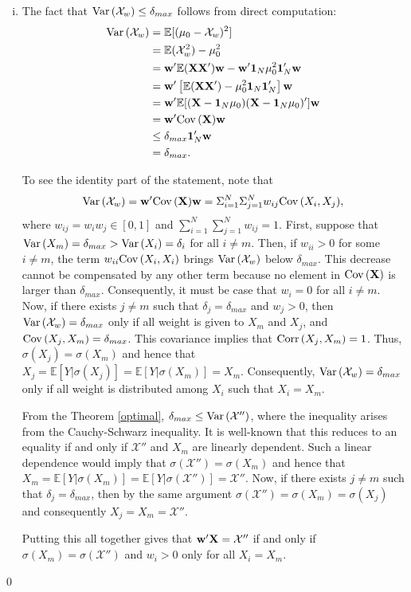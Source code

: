 \documentclass[11pt]{article}
\newcommand{\E}{\mathbb{E}}
\theoremstyle{definition}
\theoremstyle{definition}
\def\one{{\bf 1}}
\def\w{{\bf w}}
\def\X{{\bf X}}
\def\E{{\mathbb E}}
\def\Var{{\rm Var}\,}
\def\Cov{{\rm Cov}\,}
\def\Corr{{\rm Corr}\,}
\begin{document}
\begin{enumerate}[i)]

\item The fact that $\Var(\mathcal{X}_w)\leq \delta_{max}$ follows from direct computation:
\begin{align*}
\Var(\mathcal{X}_w) &= \E[(\mu_0 - \mathcal{X}_w)^2]\\
&= \E(\mathcal{X}_w^2) - \mu_0^2\\
&= \w' \E(\X \X')\w - \w'\one_N \mu_0^2\one_N'\w\\
&= \w' \left[ \E(\X \X') - \mu_0^2 \one_N \one_N' \right]\w\\
&= \w' \E[(\X - \one_N \mu_0)(\X - \one_N \mu_0)']\w\\
&= \w' \Cov(\X)\w\\
&\leq \delta_{max} \one_N'\w\\
&= \delta_{max}.
\end{align*}

To see the identity part of the statement, note that $$\Var(\mathcal{X}_w)  = \w' \Cov(\X)\w = \Sigma_{i=1}^N \Sigma_{j=1}^N w_{ij} \Cov(X_i, X_j),$$ where $w_{ij} = w_iw_j \in [0,1]$ and $\sum_{i=1}^N \sum_{j=1}^N w_{ij} = 1$.  First, suppose that $\Var(X_m) = \delta_{max} > \Var(X_i) = \delta_i$ for all $i \neq m$. Then, if $w_{ii} > 0$ for some $i \neq m$, the term $w_{ii}\Cov(X_i, X_i)$ brings $\Var(\mathcal{X}_w)$ below $\delta_{max}$. This decrease cannot be compensated by any other term because no element in $\Cov(\X)$ is larger than $\delta_{max}$. Consequently, it must be case that $w_i = 0$ for all $i \neq m$. Now, if there exists $j \neq m$ such that $\delta_j = \delta_{max}$ and $w_j > 0$, then $\Var(\mathcal{X}_w) = \delta_{max}$ only if all weight is given to $X_m$ and $X_j$, and $\Cov(X_j, X_m) = \delta_{max}$. This covariance implies that $\Corr(X_j, X_m) = 1$. Thus, $\sigma(X_j) = \sigma(X_m)$ and hence that $X_j = \E[Y | \sigma(X_j)] = \E[Y | \sigma(X_m)] = X_m$. Consequently, $\Var(\mathcal{X}_w) = \delta_{max}$ only if all weight is distributed among $X_i$ such that $X_i = X_m$. 

 From the Theorem \ref{optimal}, $\delta_{max} \leq \Var(\mathcal{X}'')$, where the inequality arises from the Cauchy-Schwarz inequality. It is well-known that this reduces to an equality if and only if $\mathcal{X}''$ and $X_m$ are linearly dependent. Such a linear dependence would imply that $\sigma(\mathcal{X}'') = \sigma(X_m)$ and hence that $X_m = \E[Y | \sigma(X_m)] = \E[Y | \sigma(\mathcal{X}'')] = \mathcal{X}''$. Now, if there exists $j \neq m$ such that $\delta_j = \delta_{max}$, then by the same argument $\sigma(\mathcal{X}'') = \sigma(X_m) = \sigma(X_j)$ and consequently $X_j = X_m = \mathcal{X}''$. 

Putting this all together gives that $\w'\X = \mathcal{X}''$ if and only if $\sigma(X_m) = \sigma(\mathcal{X}'')$ and $w_i > 0$ only for all $X_i = X_m$.

\end{enumerate}
\qed
\end{document}
